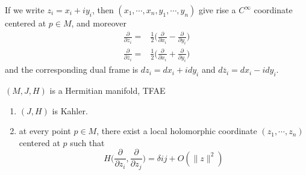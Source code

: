 \documentclass[
11pt, %
letterpaper， %
oneside, %
headinclude,footinclude, %
BCOR5mm, %
]{scrartcl}
\begin{document}
If we write $z_i=x_i+iy_i$, then $(x_1,\cdots, x_n,y_1,\cdots, y_n )$ give rise a $C^{\infty}$ coordinate centered at $p\in M$, and moreover
\begin{align*}
\frac{\partial}{\partial {z}_i}=&\frac{1}{2}\big( \frac{\partial}{\partial x_i} - \frac{\partial}{\partial y_i}\big)\\
\frac{\partial}{\partial \overline{z}_i}=&\frac{1}{2}\big( \frac{\partial}{\partial x_i} + \frac{\partial}{\partial y_i}\big)
\end{align*}
and the corresponding dual frame is $dz_i=dx_i+idy_i$ and $d\overline{z}_i=dx_i-idy_i$.

\begin{prop}
	$(M,J,H)$ is a Hermitian manifold, TFAE
	\begin{enumerate}
		\item $(J,H)$ is Kahler.
		\item at every point $p\in M$, there exist a local holomorphic coordinate $(z_1,\cdots,z_n)$ centered at $p$ such that
		\begin{equation*}
		H\big( \frac{\partial}{\partial z_i}, \frac{\partial}{\partial z_j}\big)= \delta{ij}+ O(\|z\|^2 )
		\end{equation*} 
	\end{enumerate}
\end{prop}
\end{document}

